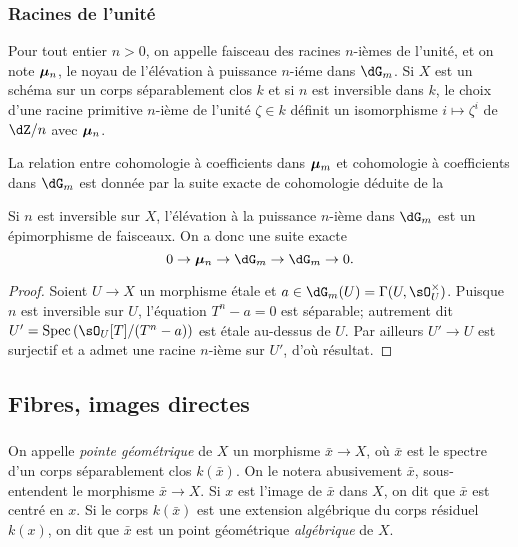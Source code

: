 \subsubsection{Racines de l'unité}\label{I:2-2-4}

Pour tout entier $n>0$, on appelle faisceau des racines $n$-ièmes de 
l'unité, et on note ${\bm\mu}_n$, le noyau de l'élévation à puissance 
$n$-iéme dans $\dG_m$. Si $X$ est un schéma sur un corps séparablement 
clos $k$ et si $n$ est inversible dans $k$, le choix d'une racine primitive 
$n$-ième de l'unité $\zeta\in k$ définit un isomorphisme 
$i\mapsto \zeta^i$ de $\dZ/n$ avec ${\bm\mu}_n$. 

La relation entre cohomologie à coefficients dans ${\bm\mu}_m$ et cohomologie à 
coefficients dans $\dG_m$ est donnée par la suite exacte de cohomologie déduite 
de la 






\begin{theorem}\label{I:2-2-5}
Si $n$ est inversible sur $X$, l'élévation à la puissance $n$-ième dans 
$\dG_m$ est un épimorphisme de faisceaux. On a donc une suite exacte 
\[
  0 \to \dmu_n \to \dG_m \to \dG_m \to 0\text{.}
\]
\end{theorem}
\begin{proof}
Soient $U\to X$ un morphisme étale et $a\in \dG_m(U) =\Gamma(U,\sO_U^\times)$. 
Puisque $n$ est inversible sur $U$, l'équation $T^n-a = 0$ est séparable; 
autrement dit $U'=\spec\left(\sO_U[T]/(T^n-a)\right)$ est étale au-dessus de 
$U$. Par ailleurs $U'\to U$ est surjectif et a admet une racine $n$-ième sur 
$U'$, d'où résultat. 
\end{proof}










\subsection{Fibres, images directes}\label{I:2-3}





\subsubsection{}\label{I:2-3-1}

On appelle \emph{pointe géométrique} de $X$ un morphisme $\bar x\to X$, où 
$\bar x$ est le spectre d'un corps séparablement clos $k(\bar x)$. On le notera 
abusivement $\bar x$, sous-entendent le morphisme $\bar x\to X$. Si $x$ est 
l'image de $\bar x$ dans $X$, on dit que $\bar x$ est centré en $x$. Si le 
corps $k(\bar x)$ est une extension algébrique du corps résiduel $k(x)$, on dit 
que $\bar x$ est un point géométrique \emph{algébrique} de $X$. 

